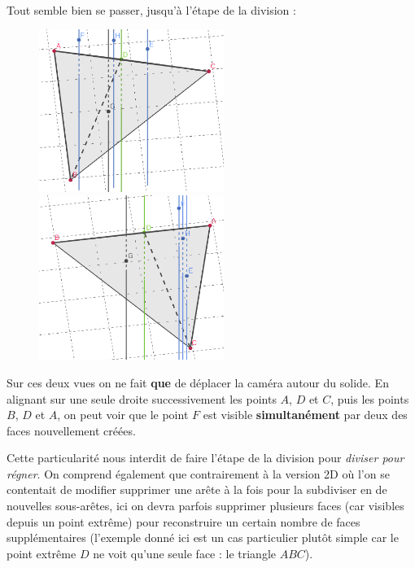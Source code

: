 \documentclass[]{article}
\begin{document}
\paragraph{}
Tout semble bien se passer, jusqu'à l'étape de la division :

\begin{figure}[H]
	\begin{center}
		\includegraphics[width=6cm]{qh3d/geogebra-export6.png}
		\includegraphics[width=6cm]{qh3d/geogebra-export7.png}
	\end{center}
\end{figure}

Sur ces deux vues on ne fait \textbf{que} de déplacer la caméra autour du solide.
En alignant sur une seule droite successivement les points $A$, $D$ et $C$, puis les points $B$, $D$ et $A$, on peut voir que le point $F$ est visible \textbf{simultanément} par deux des faces nouvellement créées.

Cette particularité nous interdit de faire l'étape de la division pour \emph{diviser pour régner}. On comprend également que contrairement à la version 2D où l'on se contentait de modifier supprimer une arête à la fois pour la subdiviser en de nouvelles sous-arêtes, ici on devra parfois supprimer plusieurs faces (car visibles depuis un point extrême) pour reconstruire un certain nombre de faces supplémentaires (l'exemple donné ici est un cas particulier plutôt simple car le point extrême $D$ ne voit qu'une seule face : le triangle $ABC$).
\end{document}

